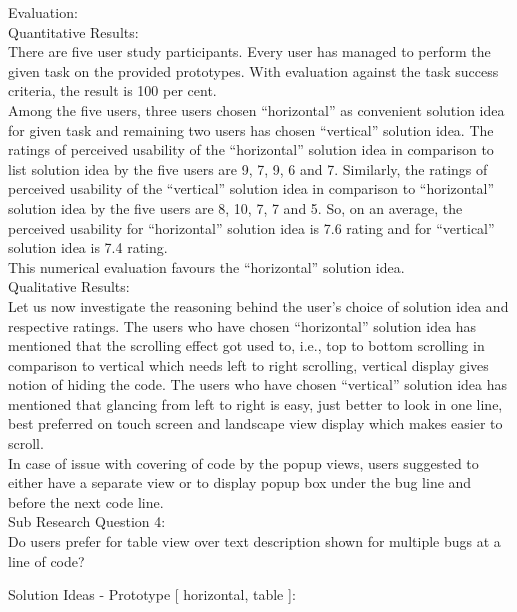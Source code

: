 Evaluation: \\

Quantitative Results: \\

There are five user study participants. Every user has managed to perform the given task on the provided prototypes. With evaluation against the task success criteria, the result is 100 per cent. \\

Among the five users, three users chosen “horizontal” as convenient solution idea for given task and remaining two users has chosen “vertical” solution idea. The ratings of perceived usability of the “horizontal” solution idea in comparison to list solution idea by the five users are 9, 7, 9, 6 and 7. Similarly, the ratings of perceived usability of the “vertical” solution idea in comparison to “horizontal” solution idea by the five users are 8, 10, 7, 7 and 5. So, on an average, the perceived usability for “horizontal” solution idea is 7.6 rating and for “vertical” solution idea is 7.4 rating. \\

This numerical evaluation favours the “horizontal” solution idea. \\

Qualitative Results: \\

Let us now investigate the reasoning behind the user’s choice of solution idea and respective ratings. The users who have chosen “horizontal” solution idea has mentioned that the scrolling effect got used to, i.e., top to bottom scrolling in comparison to vertical which needs left to right scrolling, vertical display gives notion of hiding the code. 
The users who have chosen “vertical” solution idea has mentioned that glancing from left to right is easy, just better to look in one line, best preferred on touch screen and landscape view display which makes easier to scroll. \\

In case of issue with covering of code by the popup views, users suggested to either have a separate view or to display popup box under the bug line and before the next code line. \\


Sub Research Question 4: \\

Do users prefer for table view over text description shown for multiple bugs at a line of code?

Solution Ideas - Prototype [ horizontal, table ]: \\


